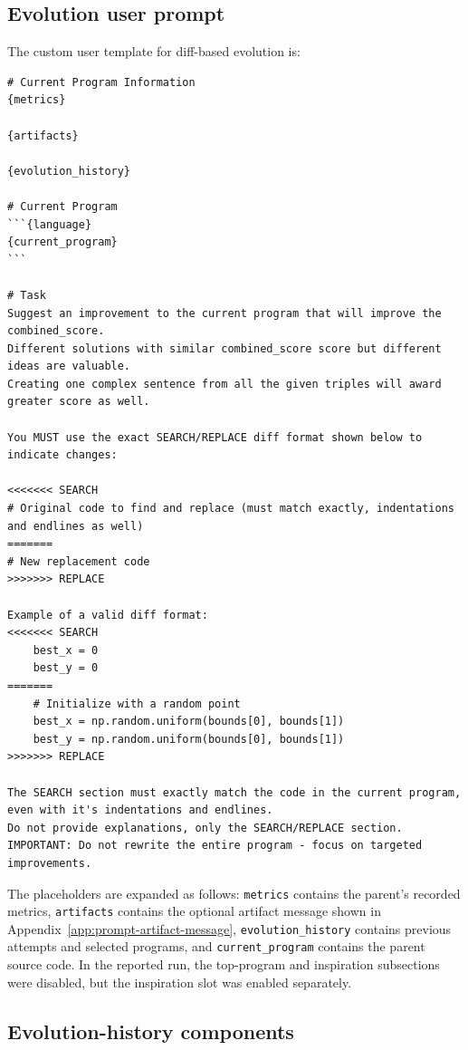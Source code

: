\subsection{Evolution user prompt}
\label{app:prompt-evolution-user}

The custom user template for diff-based evolution is:

\begin{lstlisting}
# Current Program Information
{metrics}

{artifacts}

{evolution_history}

# Current Program
```{language}
{current_program}
```

# Task
Suggest an improvement to the current program that will improve the combined_score.
Different solutions with similar combined_score score but different ideas are valuable.
Creating one complex sentence from all the given triples will award greater score as well.

You MUST use the exact SEARCH/REPLACE diff format shown below to indicate changes:

<<<<<<< SEARCH
# Original code to find and replace (must match exactly, indentations and endlines as well)
=======
# New replacement code
>>>>>>> REPLACE

Example of a valid diff format:
<<<<<<< SEARCH
    best_x = 0
    best_y = 0
=======
    # Initialize with a random point
    best_x = np.random.uniform(bounds[0], bounds[1])
    best_y = np.random.uniform(bounds[0], bounds[1])
>>>>>>> REPLACE

The SEARCH section must exactly match the code in the current program, even with it's indentations and endlines.
Do not provide explanations, only the SEARCH/REPLACE section.
IMPORTANT: Do not rewrite the entire program - focus on targeted improvements.

\end{lstlisting}

The placeholders are expanded as follows: \texttt{metrics} contains the
parent's recorded metrics, \texttt{artifacts} contains the optional artifact
message shown in Appendix~\ref{app:prompt-artifact-message},
\texttt{evolution\_history} contains previous attempts and selected programs,
and \texttt{current\_program} contains the parent source code. In the reported
run, the top-program and inspiration subsections were disabled, but the
inspiration slot was enabled separately.

\subsection{Evolution-history components}
\label{app:prompt-evolution-history}

